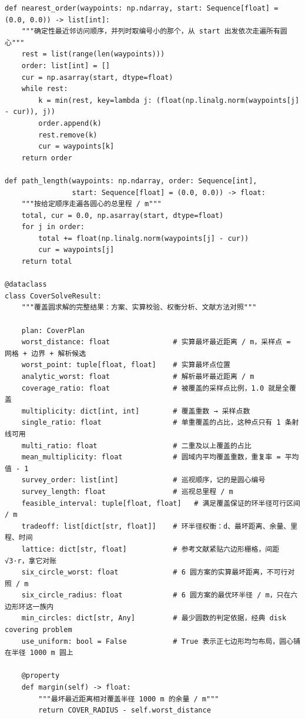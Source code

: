\documentclass[UTF8, zihao=5,AutoFakeBold=2]{ctexart}
\begin{document}
\begin{lstlisting}
def nearest_order(waypoints: np.ndarray, start: Sequence[float] = (0.0, 0.0)) -> list[int]:
    """确定性最近邻访问顺序，并列时取编号小的那个，从 start 出发依次走遍所有圆心"""
    rest = list(range(len(waypoints)))
    order: list[int] = []
    cur = np.asarray(start, dtype=float)
    while rest:
        k = min(rest, key=lambda j: (float(np.linalg.norm(waypoints[j] - cur)), j))
        order.append(k)
        rest.remove(k)
        cur = waypoints[k]
    return order

def path_length(waypoints: np.ndarray, order: Sequence[int],
                start: Sequence[float] = (0.0, 0.0)) -> float:
    """按给定顺序走遍各圆心的总里程 / m"""
    total, cur = 0.0, np.asarray(start, dtype=float)
    for j in order:
        total += float(np.linalg.norm(waypoints[j] - cur))
        cur = waypoints[j]
    return total

@dataclass
class CoverSolveResult:
    """覆盖圆求解的完整结果：方案、实算校验、权衡分析、文献方法对照"""

    plan: CoverPlan
    worst_distance: float               # 实算最坏最近距离 / m，采样点 = 网格 + 边界 + 解析候选
    worst_point: tuple[float, float]    # 实算最坏点位置
    analytic_worst: float               # 解析最坏最近距离 / m
    coverage_ratio: float               # 被覆盖的采样点比例，1.0 就是全覆盖
    multiplicity: dict[int, int]        # 覆盖重数 → 采样点数
    single_ratio: float                 # 单重覆盖的占比，这种点只有 1 条射线可用
    multi_ratio: float                  # 二重及以上覆盖的占比
    mean_multiplicity: float            # 圆域内平均覆盖重数，重复率 = 平均值 - 1
    survey_order: list[int]             # 巡视顺序，记的是圆心编号
    survey_length: float                # 巡视总里程 / m
    feasible_interval: tuple[float, float]   # 满足覆盖保证的环半径可行区间 / m
    tradeoff: list[dict[str, float]]    # 环半径权衡：d、最坏距离、余量、里程、时间
    lattice: dict[str, float]           # 参考文献紧贴六边形栅格，间距 √3·r，拿它对账
    six_circle_worst: float             # 6 圆方案的实算最坏距离，不可行对照 / m
    six_circle_radius: float            # 6 圆方案的最优环半径 / m，只在六边形环这一族内
    min_circles: dict[str, Any]         # 最少圆数的判定依据，经典 disk covering problem
    use_uniform: bool = False           # True 表示正七边形均匀布局，圆心铺在半径 1000 m 圆上

    @property
    def margin(self) -> float:
        """最坏最近距离相对覆盖半径 1000 m 的余量 / m"""
        return COVER_RADIUS - self.worst_distance


\end{lstlisting}
\end{document}
